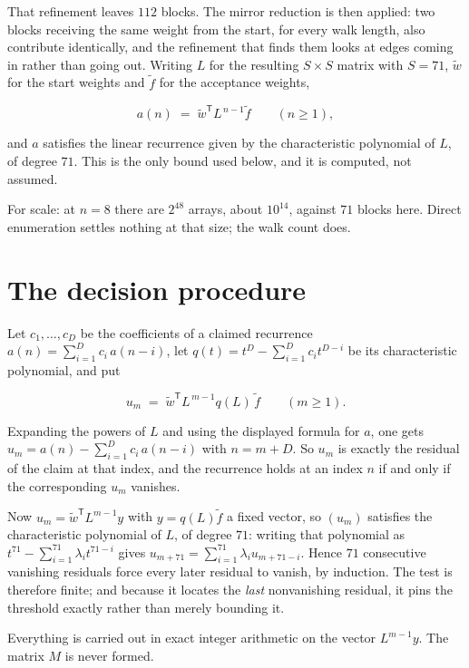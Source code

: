 \documentclass[11pt]{article}
\theoremstyle{definition}
\begin{document}
That refinement leaves $112$ blocks. The mirror reduction is then applied: two blocks receiving the same weight from the start, for every walk length, also contribute identically, and the refinement that finds them looks at edges coming in rather than going out. Writing $L$ for the resulting $S \times S$ matrix with $S = 71$, $\tilde w$ for the start weights and $\tilde f$ for the acceptance weights,

\[a(n) \;=\; \tilde w^{\mathsf T} L^{\,n-1} \tilde f \qquad (n \ge 1),\]

and $a$ satisfies the linear recurrence given by the characteristic polynomial of $L$, of degree $71$. This is the only bound used below, and it is computed, not assumed.

For scale: at $n = 8$ there are $2^{48}$ arrays, about $10^{14}$, against $71$ blocks here. Direct enumeration settles nothing at that size; the walk count does.

\section{The decision procedure}

Let $c_1,\dots,c_D$ be the coefficients of a claimed recurrence $a(n) = \sum_{i=1}^{D} c_i\,a(n-i)$, let $q(t) = t^{D} - \sum_{i=1}^{D} c_i t^{D-i}$ be its characteristic polynomial, and put

\[u_m \;=\; \tilde w^{\mathsf T} L^{\,m-1} q(L)\,\tilde f \qquad (m \ge 1).\]

Expanding the powers of $L$ and using the displayed formula for $a$, one gets $u_m = a(n) - \sum_{i=1}^{D} c_i\,a(n-i)$ with $n = m + D$. So $u_m$ is exactly the residual of the claim at that index, and the recurrence holds at an index $n$ if and only if the corresponding $u_m$ vanishes.

Now $u_m = \tilde w^{\mathsf T} L^{m-1} y$ with $y = q(L)\tilde f$ a fixed vector, so $(u_m)$ satisfies the characteristic polynomial of $L$, of degree $71$: writing that polynomial as $t^{71} - \sum_{i=1}^{71} \lambda_i t^{71-i}$ gives $u_{m+71} = \sum_{i=1}^{71} \lambda_i u_{m+71-i}$. Hence $71$ consecutive vanishing residuals force every later residual to vanish, by induction. The test is therefore finite; and because it locates the {\itshape last} nonvanishing residual, it pins the threshold exactly rather than merely bounding it.

Everything is carried out in exact integer arithmetic on the vector $L^{m-1}y$. The matrix $M$ is never formed.
\end{document}

